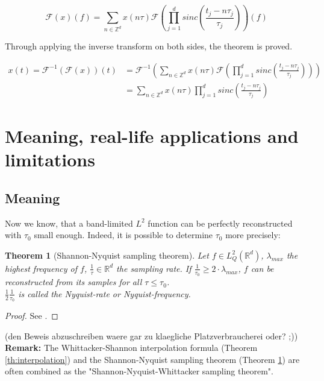 \documentclass[a4paper, 11pt]{scrreprt}
\newtheorem{theorem}[defi]{Theorem}
\newcommand{\RR}{\mathbb{R}}
\newcommand{\ZZ}{\mathbb{Z}}
\newcommand{\FF}{\mathcal{F}}
\begin{document}
\[\FF(x)(f) = \sum_{n \in \ZZ^d} x(n\tau) \FF\left(\prod_{j=1}^d sinc \left( \frac{t_j - n \tau_j}{\tau_j} \right) \right)(f)\]

Through applying the inverse transform on both sides, the theorem is proved.

\begin{align*}
x(t) = \FF^{-1}(\FF(x))(t) &= \FF^{-1} \left( \sum_{n \in \ZZ^d} x(n \tau) \FF \left( \prod_{j=1}^d sinc \left( \frac{t_j - n \tau_j}{\tau_j} \right) \right) \right) \\
&= \sum_{n \in \ZZ^d} x(n\tau) \prod_{j=1}^d sinc \left( \frac{t_j - n \tau_j}{\tau_j} \right)
\end{align*}

\section{Meaning, real-life applications and limitations}

\subsection{Meaning}

Now we know, that a band-limited \(L^2\) function can be perfectly reconstructed with \(\tau_0\) small enough. Indeed, it is possible to determine \(\tau_0\) more precisely:
\begin{theorem}[Shannon-Nyquist sampling theorem]
\label{th:sampling}
Let \(f\in L^2_Q(\RR^d)\), \(\lambda_{max}\) the highest frequency of \(f\), \(\frac{1}{\tau}\in \RR^d\) the sampling rate. If \(\frac{1}{\tau_0} \geq 2\cdot \lambda_{max}\), \(f\) can be reconstructed from its samples for all \(\tau \leq \tau_0\).\\
\(\frac 1 2 \frac{1}{\tau_0}\) is called the Nyquist-rate or Nyquist-frequency.
\end{theorem} 
\begin{proof}
See \cite{shannon01}.
\end{proof}
(den Beweis abzuschreiben waere gar zu klaegliche Platzverbraucherei oder? ;))\\
\textbf{Remark:} The Whittacker-Shannon interpolation formula (Theorem  \ref{th:interpolation}) and the Shannon-Nyquist sampling theorem (Theorem \ref{th:sampling}) are often combined as the "Shannon-Nyquist-Whittacker sampling theorem".\\
\end{document}
